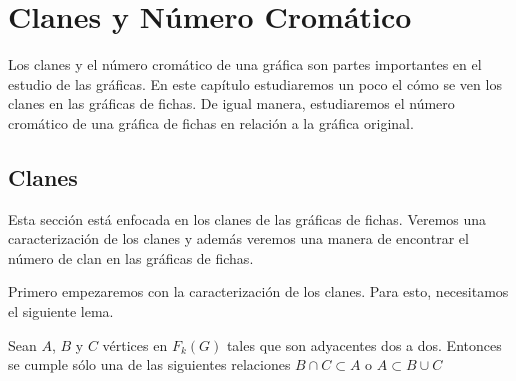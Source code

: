 \chapter{Clanes y N\'umero Crom\'atico}%
\label{cap:Clique-ChromNum}
Los clanes y el n\'umero crom\'atico de una gr\'afica son partes importantes en
el estudio de las gr\'aficas. En este cap\'itulo estudiaremos un poco el c\'omo
se ven los clanes en las gr\'aficas de fichas. De igual manera, estudiaremos el
n\'umero crom\'atico de una gr\'afica de fichas en relaci\'on a la gr\'afica
original.

\section{Clanes}%
\label{sec:clanes}

Esta secci\'on est\'a enfocada en los clanes de las gr\'aficas de fichas.
Veremos una caracterizaci\'on de los clanes y adem\'as veremos una manera de
encontrar el n\'umero de clan en las gr\'aficas de fichas.

Primero empezaremos con la caracterizaci\'on de los clanes. Para esto,
necesitamos el siguiente lema. 

\begin{lema}%
\label{lem:K3}
    Sean $A$, $B$ y $C$ v\'ertices en $F_k(G)$ tales que son adyacentes dos a
    dos. Entonces se cumple s\'olo una de las siguientes relaciones $B \cap C
    \subset A$ o $A \subset B \cup C$
\end{lema}

